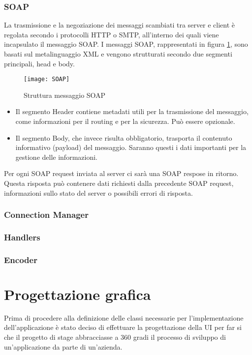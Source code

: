 \subsubsection{SOAP}
La trasmissione e la negoziazione dei messaggi scambiati tra server e client è regolata secondo i protocolli HTTP o SMTP, all'interno dei quali viene incapsulato il messaggio SOAP.
I messaggi SOAP, rappresentati in figura \ref{fig:SOAP}, sono basati sul metalinguaggio XML e vengono strutturati secondo due segmenti principali, head e body. 
\begin{figure}[H] 
	\centering
	\texttt{[image: SOAP]}
	\caption{Struttura messaggio SOAP}
	\label{fig:SOAP}
\end{figure}
\begin{itemize}
	\item Il segmento Header contiene metadati utili per la trasmissione del messaggio, come informazioni per il routing e per la sicurezza. Può essere opzionale.
	\item Il segmento Body, che invece risulta obbligatorio, trasporta il contenuto informativo (payload) del messaggio. Saranno questi i dati importanti per la gestione delle informazioni.
\end{itemize}
Per ogni SOAP request inviata al server ci sarà una SOAP respose in ritorno. Questa risposta può contenere dati richiesti dalla precedente SOAP request, informazioni sullo stato del server o possibili errori di risposta.
\subsubsection{Connection Manager}
\subsubsection{Handlers}
\subsubsection{Encoder}
\section{Progettazione grafica}
Prima di procedere alla definizione delle classi necessarie per l'implementazione 
dell'applicazione è stato deciso di effettuare la progettazione della UI per far 
si che il progetto di stage abbracciasse a 360 gradi il processo di sviluppo di 
un'applicazione da parte di un'azienda.

